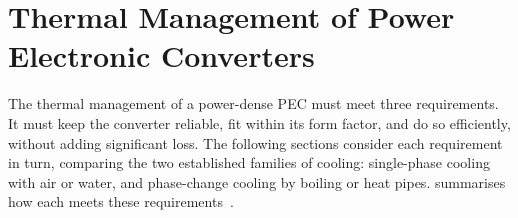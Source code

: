 \section{Thermal Management of Power Electronic Converters}
\label{sec:thermal-management}

The thermal management of a power-dense PEC must meet three requirements. It
must keep the converter reliable, fit within its form factor, and do so
efficiently, without adding significant loss. 
The following sections consider each requirement
in turn, comparing the two established families of cooling: single-phase
cooling with air or water, and phase-change cooling by boiling or heat pipes.
 summarises how each meets these
requirements~\cite{liu_thermal_2025,rahman_emerging_2024,laloya_heat_2016,mudawar_assessment_2001}.

